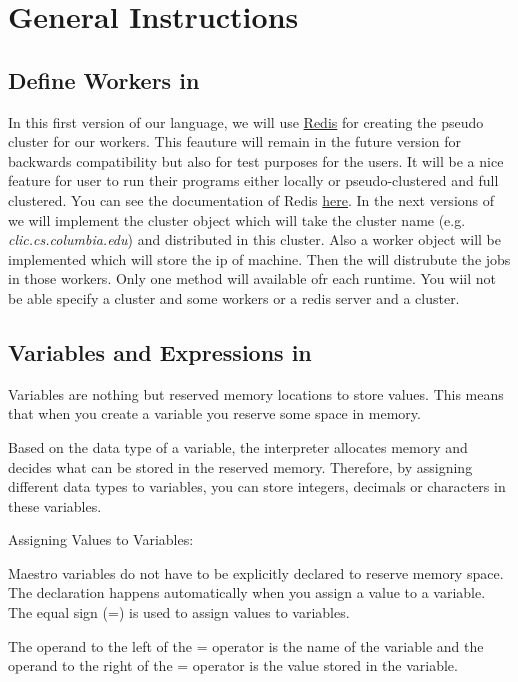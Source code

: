 \section{General Instructions}
\label{sect:general}

\subsection*{Define Workers in \lang{}}
In this first version of our \lang{} language, we will use \href{http://www.redis.io}{Redis}
for creating the pseudo cluster for our workers. This feauture will remain in the future version for backwards compatibility but also for test purposes for the users.
It will be a nice feature for user to run their \lang{} programs either locally or pseudo-clustered and full clustered.
You can see the documentation of Redis \href{http://redis.io/documentation}{here}.
In the next versions of \lang{} we will implement the cluster object which will take the cluster name (e.g. \textit{clic.cs.columbia.edu}) and distributed in this cluster.
Also a worker object will be implemented which will store the ip of machine. Then the \lang{} will distrubute the jobs in those workers.
Only one method will available ofr each runtime. You wiil not be able specify a cluster and some workers or a redis server and a cluster.

\subsection*{Variables and Expressions in \lang{}}
Variables are nothing but reserved memory locations to store values. This means that when you create a variable you reserve some space in memory.

Based on the data type of a variable, the interpreter allocates memory and decides what can be stored in the reserved memory. Therefore, by assigning different data types to variables, you can store integers, decimals or characters in these variables.

Assigning Values to Variables:

Maestro variables do not have to be explicitly declared to reserve memory space. The declaration happens automatically when you assign a value to a variable. The equal sign (=) is used to assign values to variables.

The operand to the left of the = operator is the name of the variable and the operand to the right of the = operator is the value stored in the variable. 

